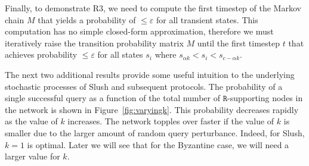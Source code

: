 \documentclass[letterpaper,twocolumn,10pt]{article}
\newcommand{\tronly}[2]{#1}
\theoremstyle{definition}
\begin{document}
\begin{appendices}
Finally, to demonstrate R3, we need to compute the first timestep of the Markov chain $M$ that yields a probability of $\leq \varepsilon$ for all transient states.
This computation has no simple closed-form approximation, therefore we must iteratively raise the transition probability matrix $M$ until the first timestep $t$ that achieves probability $\leq \varepsilon$ for all states $s_i$ where $s_{\alpha k} < s_i < s_{c - \alpha k}$.


\tronly{
The next two additional results provide some useful intuition to the underlying stochastic processes of Slush and subsequent protocols. 
The probability of a single successful query as a function of the total number of $\mathtt{R}$-supporting nodes in the network is shown in Figure~\ref{fig:varyingk}.
This probability decreases rapidly as the value of $k$ increases.
The network topples over faster if the value of $k$ is smaller due to the larger amount of random query perturbance.
Indeed, for Slush, $k=1$ is optimal.
Later we will see that for the Byzantine case, we will need a larger value for $k$.
}{}


\end{appendices}
\end{document}
